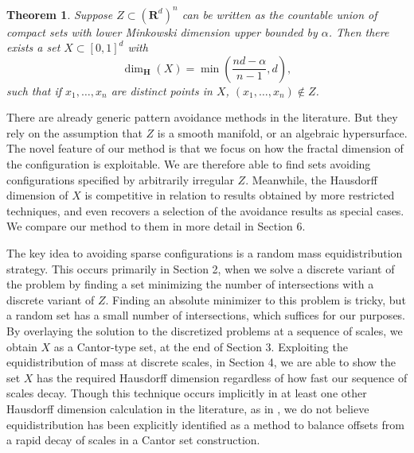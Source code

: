 \documentclass{article}
\theoremstyle{plain}
\theoremstyle{plain}
\newtheorem{theorem}{Theorem}
\begin{document}
\begin{theorem}
	Suppose $Z \subset (\mathbf{R}^d)^n$ can be written as the countable union of compact sets with lower Minkowski dimension upper bounded by $\alpha$. Then there exists a set $X \subset [0,1]^d$ with
	\[ \dim_{\mathbf{H}}(X) = \min \left( \frac{nd - \alpha}{n-1}, d \right), \]
	such that if $x_1, \dots, x_n$ are distinct points in $X$, $(x_1, \dots, x_n) \not \in Z$.
\end{theorem}

There are already generic pattern avoidance methods in the literature. But they rely on the assumption that $Z$ is a smooth manifold, or an algebraic hypersurface. The novel feature of our method is that we focus on how the fractal dimension of the configuration is exploitable. We are therefore able to find sets avoiding configurations specified by arbitrarily irregular $Z$. Meanwhile, the Hausdorff dimension of $X$ is competitive in relation to results obtained by more restricted techniques, and even recovers a selection of the avoidance results as special cases. We compare our method to them in more detail in Section 6.

The key idea to avoiding sparse configurations is a random mass equidistribution strategy. This occurs primarily in Section 2, when we solve a discrete variant of the problem by finding a set minimizing the number of intersections with a discrete variant of $Z$. Finding an absolute minimizer to this problem is tricky, but a random set has a small number of intersections, which suffices for our purposes. By overlaying the solution to the discretized problems at a sequence of scales, we obtain $X$ as a Cantor-type set, at the end of Section 3. Exploiting the equidistribution of mass at discrete scales, in Section 4, we are able to show the set $X$ has the required Hausdorff dimension regardless of how fast our sequence of scales decay. Though this technique occurs implicitly in at least one other Hausdorff dimension calculation in the literature, as in \cite{MalabikaRob}, we do not believe equidistribution has been explicitly identified as a method to balance offsets from a rapid decay of scales in a Cantor set construction.


%
\end{document}
